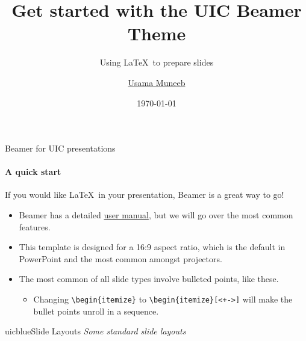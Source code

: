 \documentclass{beamer}
\title{Get started with the UIC Beamer Theme}
\subtitle{Using \LaTeX\ to prepare slides}
\author{\href{mailto:umunee2@uic.edu}{Usama Muneeb}}
\date{\today}
\newcommand{\hrefcol}[2]{\textcolor{uihteal}{\href{#1}{#2}}}
\begin{document}
\maketitle
{} %



\begin{frame}[fragile]{Beamer for UIC presentations}
\framesubtitle{A quick start}
If you would like \LaTeX\ in your presentation, Beamer is a great way to go!
\begin{itemize}
\item Beamer has a detailed
\hrefcol{https://www.ctan.org/tex-archive/macros/latex/contrib/beamer/doc/beameruserguide.pdf}{user
 manual}, but we will go over the most common features.
\item This template is designed for a 16:9 aspect ratio, which is the default in PowerPoint and the most common amongst projectors.
\end{itemize}
\begin{itemize}[<+->]
\item The most common of all slide types involve bulleted points, like these.
\begin{itemize}
\item Changing \verb|\begin{itemize}| to \verb|\begin{itemize}[<+->]| will make the bullet points unroll in a sequence.
\end{itemize}
\end{itemize}
\end{frame}


\begin{chapter}{uicblue}{Slide Layouts}
\textit{Some standard slide layouts}
\end{chapter}
\end{document}
